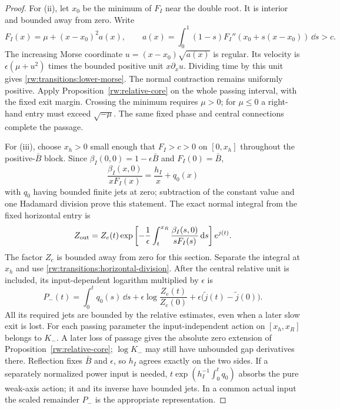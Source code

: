\begin{proof}
For (ii), let $x_0$ be the minimum of $F_I$ near the double root.
It is interior and bounded away from zero. Write
\[
 F_I(x)=\mu+(x-x_0)^2a(x),\qquad
 a(x)=\int_0^1(1-s)F_I''(x_0+s(x-x_0))\,\dd s>c.
\]
The increasing Morse coordinate $u=(x-x_0)\sqrt{a(x)}$ is regular.
Its velocity is $\epsilon(\mu+u^2)$ times the bounded positive
unit $x\partial_xu$. Dividing time by this unit gives
\eqref{rw:transitions:lower-morse}. The normal contraction remains uniformly positive.
Apply Proposition~\ref{rw:relative-core} on the whole passing interval,
with the fixed exit margin. Crossing the minimum requires $\mu>0$;
for $\mu\le0$ a right-hand entry must exceed $\sqrt{-\mu}$.
The same fixed phase and central connections complete the passage.

For (iii), choose $x_h>0$ small enough that $F_I>c>0$ on
$[0,x_h]$ throughout the positive-$\bar B$ block. Since
$\beta_I(0,0)=1-\epsilon\bar B$ and $F_I(0)=\bar B$,
\begin{equation}\label{rw:transitions:horizontal-division}
 \frac{\beta_I(x,0)}{xF_I(x)}=\frac{h_I}{x}+q_0(x)
\end{equation}
with $q_0$ having bounded finite jets at zero; subtraction of the
constant value and one Hadamard division prove this statement.
The exact normal integral from the fixed horizontal entry is
\[
 Z_{\rm out}=Z_e(t)
 \exp\left[-\frac1\epsilon\int_t^{x_R}
       \frac{\beta_I(s,0)}{sF_I(s)}\,\mathrm d s\right]e^{j(t)}.
\]
The factor $Z_e$ is bounded away from zero for this section.
Separate the integral at $x_h$ and use
\eqref{rw:transitions:horizontal-division}. After the central relative
unit is included, its input-dependent logarithm multiplied by
$\epsilon$ is
\[
 P_-(t)=\int_0^t q_0(s)\,\dd s
 +\epsilon\log\frac{Z_e(t)}{Z_e(0)}
 +\epsilon\bigl(\widetilde j(t)-\widetilde j(0)\bigr).
\]
All its required jets are bounded by the relative estimates, even
when a later slow exit is lost. For each passing parameter the
input-independent action on $[x_h,x_R]$ belongs to $K_-$.
A later loss of passage gives the absolute zero extension of
Proposition~\ref{rw:relative-core}; $\log K_-$ may still have
unbounded gap derivatives there.
Reflection fixes $\bar B$ and $\epsilon$, so $h_I$ agrees exactly
on the two sides. If a separately normalized power input is needed,
$t\exp(h_I^{-1}\int_0^t q_0)$ absorbs the pure weak-axis action;
it and its inverse have bounded jets. In a common actual input the
scaled remainder $P_-$ is the appropriate representation.


\end{proof}
